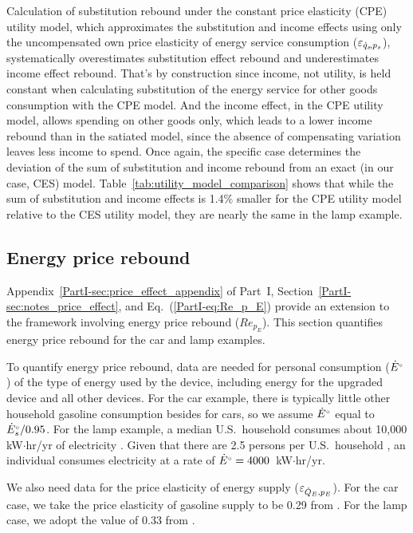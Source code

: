 \documentclass[12pt]{article}\usepackage[]{graphicx}\usepackage[]{xcolor}
\begin{document}
Calculation of substitution rebound under the 
constant price elasticity (CPE) utility model, 
which approximates the substitution and income effects 
using only the uncompensated own price elasticity 
of energy service consumption ($\varepsilon_{\dot{q}_s\!,p_s}$),
systematically overestimates substitution effect rebound
and underestimates income effect rebound.
That's by construction since income, 
not utility, 
is held constant when calculating substitution
of the energy service for other goods consumption
with the CPE model. 
And the income effect, in the CPE utility model,
allows spending on other goods only, 
which leads to a lower income rebound 
than in the satiated model,
since the absence of compensating variation 
leaves less income to spend.
Once again, 
the specific case determines 
the deviation of the sum of substitution and income rebound
from an exact (in our case, CES) model.
Table~\ref{tab:utility_model_comparison}
shows that while the sum of substitution and income effects 
is 1.4\% smaller for the 
CPE utility model relative to the CES utility model, 
they are nearly the same in the lamp example.


\subsection{Energy price rebound}
\label{sec:price_effect_results}

Appendix~\ref{PartI-sec:price_effect_appendix}
of Part~I, 
Section~\ref{PartI-sec:notes_price_effect}, and
Eq.~(\ref{PartI-eq:Re_p_E})
provide an extension to the framework
involving energy price rebound ($Re_{p_E}$).
This section quantifies energy price rebound
for the car and lamp examples.

To quantify energy price rebound,
data are needed for
personal consumption (${}{\dot{E}}^{\scriptscriptstyle \circ}$)
of the type of energy used by the device,
including energy for the upgraded device and all other devices.
For the car example,
there is typically little other household gasoline consumption
besides for cars,
so we assume ${}{\dot{E}}^{\scriptscriptstyle \circ}$ equal to
${}{\dot{E}}^{\scriptscriptstyle \circ}_s/0.95$.
For the lamp example,
a median U.S.\ household consumes about
10,000 kW$\cdot$hr/yr of electricity
\citep{U.S.-Energy-Information-Agency:2023aa}.
Given that there are 2.5 persons per U.S.\ household
\citep{Statista:2024aa},
an individual consumes electricity at a rate of
${}{\dot{E}}^{\scriptscriptstyle \circ} = 4000$~kW$\cdot$hr/yr.

We also need data for the price elasticity
of energy supply ($\varepsilon_{\dot{Q}_E,p_E}$).
For the car case,
we take
the price elasticity of gasoline supply to be 0.29
from \citet{Coyle:2012aa}.
For the lamp case, we adopt the value of
0.33 from \citet[Table~3]{Ghoddusia:2017aa}.
\end{document}
